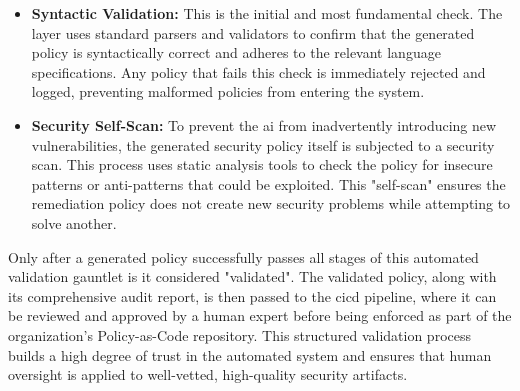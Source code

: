 \begin{itemize}
    \item \textbf{Syntactic Validation:} This is the initial and most fundamental check. The layer uses standard parsers and validators to confirm that the generated policy is syntactically correct and adheres to the relevant language specifications. Any policy that fails this check is immediately rejected and logged, preventing malformed policies from entering the system.
    \item \textbf{Security Self-Scan:} To prevent the \gls{ai} from inadvertently introducing new vulnerabilities, the generated security policy itself is subjected to a security scan. This process uses static analysis tools to check the policy for insecure patterns or anti-patterns that could be exploited. This "self-scan" ensures the remediation policy does not create new security problems while attempting to solve another.
\end{itemize}

Only after a generated policy successfully passes all stages of this automated validation gauntlet is it considered "validated". The validated policy, along with its comprehensive audit report, is then passed to the \gls{cicd} pipeline, where it can be reviewed and approved by a human expert before being enforced as part of the organization's Policy-as-Code repository. This structured validation process builds a high degree of trust in the automated system and ensures that human oversight is applied to well-vetted, high-quality security artifacts.

